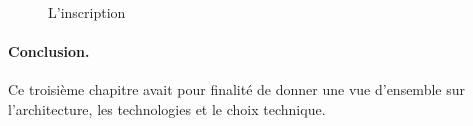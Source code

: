 \clearpage
\begin{figure}%
    \centering
    \qquad
    \caption{L'inscription}%
\end{figure}
\paragraph{Conclusion.} Ce troisième chapitre avait pour finalité de donner une vue d'ensemble sur l'architecture, les technologies et le choix technique.

